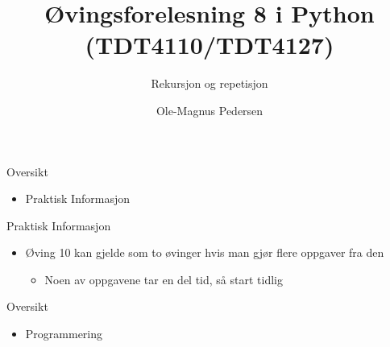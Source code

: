 \documentclass[screen, aspectratio=169]{beamer}
\title[Short title]{Øvingsforelesning 8 i Python (TDT4110/TDT4127)}
\subtitle{Rekursjon og repetisjon}
\author[O.M. Pedersen]{Ole-Magnus Pedersen}
\institute[NTNU]{}
\date{}
\begin{document}
\begin{frame}
  \titlepage
\end{frame}

\begin{frame}{Oversikt}
	\begin{itemize}
		\item Praktisk Informasjon
	\end{itemize}
\end{frame}

\begin{frame}{Praktisk Informasjon}
    \begin{itemize}
        \item Øving 10 kan gjelde som to øvinger hvis man gjør flere oppgaver fra den
        \begin{itemize}
            \item Noen av oppgavene tar en del tid, så start tidlig
        \end{itemize}
    \end{itemize}
    
\end{frame}
\iffalse
\begin{frame}{Oversikt}
	\begin{itemize}
		\begin{transparent}
		\item Praktisk Informasjon
		\end{transparent}
		\item Gjennomgang av øving 7
		\begin{transparent}
		\item Programmering
		\end{transparent}
	\end{itemize}
\end{frame}
\fi

\begin{frame}{Oversikt}
	\begin{itemize}
		\item Programmering
	\end{itemize}
\end{frame}

\end{document}
